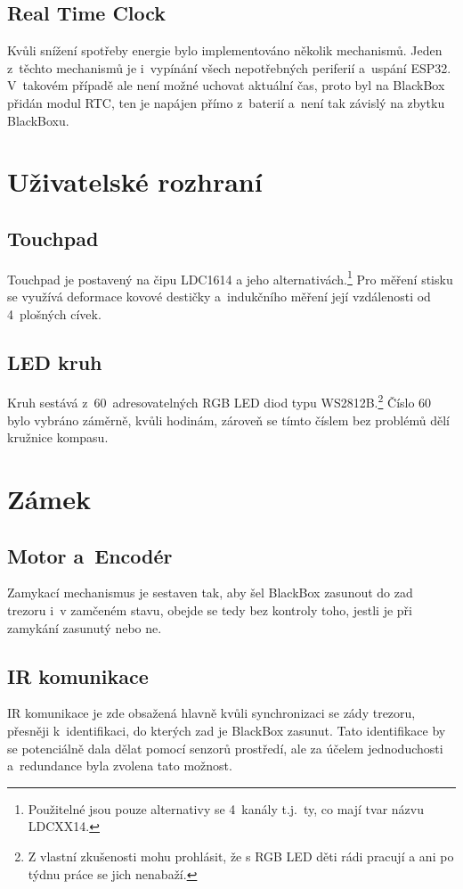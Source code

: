 \subsection{Real Time Clock}
Kvůli snížení spotřeby energie bylo implementováno několik mechanismů.
Jeden z~těchto mechanismů je i~vypínání všech nepotřebných periferií a~uspání ESP32. V~takovém případě ale není možné uchovat aktuální čas, proto byl na BlackBox přidán modul RTC, ten je napájen přímo z~baterií a~není tak závislý na zbytku BlackBoxu.

\section{Uživatelské rozhraní}

\subsection{Touchpad}
Touchpad je postavený na čipu LDC1614 a jeho alternativách.\footnote{Použitelné jsou pouze alternativy se 4~kanály t.j.~ty, co mají tvar názvu LDCXX14.}
Pro měření stisku se využívá deformace kovové destičky a~indukčního měření její vzdálenosti od 4~plošných cívek.

\subsection{LED kruh}
Kruh sestává z~60~adresovatelných RGB LED diod typu WS2812B.\footnote{Z vlastní zkušenosti mohu prohlásit, že s RGB LED děti rádi pracují a ani po týdnu práce se jich nenabaží.}
Číslo 60 bylo vybráno záměrně, kvůli hodinám, zároveň se tímto číslem bez problémů dělí kružnice kompasu.


\section{Zámek}

\subsection{Motor a~Encodér}
Zamykací mechanismus je sestaven tak, aby šel BlackBox zasunout do zad trezoru i~v zamčeném stavu, obejde se tedy bez kontroly toho, jestli je při zamykání zasunutý nebo ne.

\subsection{IR komunikace}
IR komunikace je zde obsažená hlavně kvůli synchronizaci se zády trezoru, přesněji k~identifikaci, do kterých zad je BlackBox zasunut.
Tato identifikace by se potenciálně dala dělat pomocí senzorů prostředí, ale za účelem jednoduchosti a~redundance byla zvolena tato možnost.

